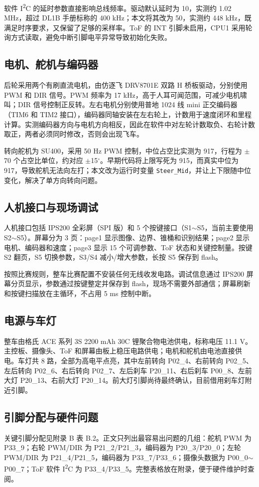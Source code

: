 \documentclass{MaiTechReport}
\begin{document}
软件 I\textsuperscript{2}C 的延时参数直接影响总线频率。驱动默认延时为 10，实测约 1.02 MHz，超过 DL1B 手册标称的 400 kHz；本文将其改为 50，实测约 448 kHz，既满足时序要求，又保留了足够的采样率。ToF 的 INT 引脚未启用，CPU1 采用轮询方式读取，避免中断引脚电平异常导致初始化失败。

\subsection{电机、舵机与编码器}
后轮采用两个有刷直流电机，由仿逐飞 DRV8701E 双路 H 桥板驱动，分别使用 PWM 和 DIR 信号。PWM 频率为 17 kHz，高于人耳可闻范围，可减少电机啸叫；DIR 信号控制正反转。左右电机分别使用普地 1024 线 mini 正交编码器（TIM6 和 TIM2 接口），编码器同轴安装在左右轮上，计数用于速度闭环和里程计算。实测编码器方向与电机方向相反，因此在软件中对左轮计数取负、右轮计数取正，两者必须同时修改，否则会出现飞车。

转向舵机为 SU400，采用 50 Hz PWM 控制，中位占空比实测为 917，行程为 $\pm$70 个占空比单位，约对应 $\pm$15$^\circ$。早期代码将上限写死为 915，而真实中位为 917，导致舵机无法向左打；本文改为运行时变量 \texttt{Steer\_Mid}，并让上下限随中位变化，解决了单方向转向问题。

\subsection{人机接口与现场调试}
人机接口包括 IPS200 全彩屏（SPI 版）和 5 个按键接口（S1$\sim$S5，当前主要使用 S2$\sim$S5）。屏幕分为 3 页：page1 显示图像、边界、锥桶和识别结果；page2 显示电机、编码器和速度；page3 显示 15 个可调参数、ToF 状态和关键控制量。按键 S2 翻页，S5 切换参数，S3/S4 减小/增大参数，长按 S5 保存到 flash。

按照比赛规则，整车比赛配置不安装任何无线收发电路。调试信息通过 IPS200 屏幕分页显示，参数通过按键整定并保存到 flash，现场不需要外部通信；屏幕刷新和按键扫描放在主循环，不占用 5 ms 控制中断。

\subsection{电源与车灯}
整车由格氏 ACE 系列 3S 2200 mAh 30C 锂聚合物电池供电，标称电压 11.1 V。主控板、摄像头、ToF 和屏幕由板上稳压电路供电；电机和舵机由电池直接供电。车灯共 8 路，全部为高电平点亮，其中左前转向 P02\_4、右前转向 P02\_5、左后转向 P02\_6、右后转向 P02\_7、左后刹车 P20\_11、右后刹车 P00\_8、左前大灯 P20\_13、右前大灯 P20\_14。前大灯引脚尚待最终确认，目前借用刹车灯附近引脚。

\subsection{引脚分配与硬件问题}
关键引脚分配见附录 B 表 B.2。正文只列出最容易出问题的几组：舵机 PWM 为 P33\_9；右轮 PWM/DIR 为 P21\_2/P21\_3，编码器为 P20\_3/P20\_0；左轮 PWM/DIR 为 P21\_4/P21\_5，编码器为 P33\_7/P33\_6；摄像头数据为 P00\_0$\sim$P00\_7；ToF 软件 I\textsuperscript{2}C 为 P33\_4/P33\_5。完整表格放在附录，便于硬件维护时查阅。
\end{document}
